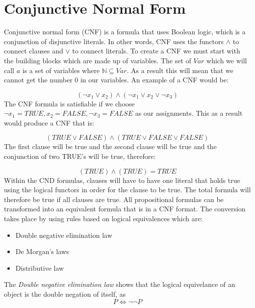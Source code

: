 \documentclass[11pt,a4paper]{report}
\begin{document}
\section{Conjunctive Normal Form}
Conjunctive normal form (CNF) is a formula that uses Boolean logic, which is a conjunction of disjunctive literals. In other words, CNF uses the functors $\land$ to connect clauses and $\lor$ to connect literals.
To create a CNF we must start with the building blocks which are made up of variables. The set of $Var$ which we will call $a$ is a set of variables where $\mathbb{N} \subseteq Var$. As a result this will mean that we cannot get the number $0$ in our variables.
An example of a CNF would be:

\begin{displaymath}
(\neg x _1 \lor x _2) \land (\neg x _1 \lor x _2 \lor \neg x _3)
\end{displaymath}
The CNF formula is satisfiable if we choose $\neg x_1 = TRUE, x _2 = FALSE, \neg x_3 = FALSE$ as our assignments. This as a result would produce a CNF that is:

\begin{displaymath}
(TRUE \lor FALSE) \land (TRUE \lor FALSE \lor FALSE)
\end{displaymath}
The first clause will be true and the second clause will be true and the conjunction of two TRUE's will be true, therefore:

\begin{displaymath}
(TRUE) \land (TRUE) = TRUE
\end{displaymath}
Within the CND formulas, clauses will have to have one literal that holds true using the logical functors in order for the clause to be true. The total formula will therefore be true if all clauses are true.
All propositional formulas can be transformed into an equivalent formula that is in a CNF format. The conversion takes place by using rules based on logical equivalences which are:

\begin{itemize}
\item Double negative elimination law
\item De Morgan's laws
\item Distributive law
\end{itemize}


The \emph{Double negative elimination law} shows that the logical equivelance of an object is the double negation of itself, as
\begin{displaymath}
 P \Leftrightarrow \neg \neg P
\end{displaymath}
\end{document}
